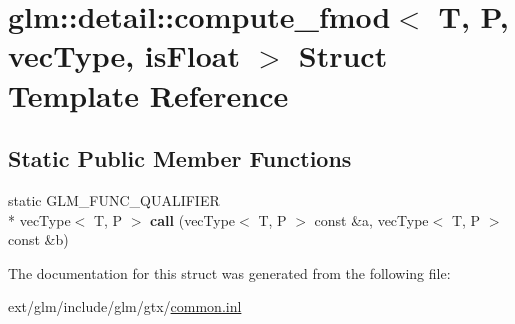 \hypertarget{structglm_1_1detail_1_1compute__fmod}{\section{glm\-:\-:detail\-:\-:compute\-\_\-fmod$<$ T, P, vec\-Type, is\-Float $>$ Struct Template Reference}
\label{structglm_1_1detail_1_1compute__fmod}
}
\subsection*{Static Public Member Functions}
\begin{DoxyCompactItemize}
\item 
\hypertarget{structglm_1_1detail_1_1compute__fmod_add2143b71c7bfb64b030b4eed6ea3ef6}{static G\-L\-M\-\_\-\-F\-U\-N\-C\-\_\-\-Q\-U\-A\-L\-I\-F\-I\-E\-R \\*
vec\-Type$<$ T, P $>$ {\bfseries call} (vec\-Type$<$ T, P $>$ const \&a, vec\-Type$<$ T, P $>$ const \&b)}\label{structglm_1_1detail_1_1compute__fmod_add2143b71c7bfb64b030b4eed6ea3ef6}

\end{DoxyCompactItemize}


The documentation for this struct was generated from the following file\-:\begin{DoxyCompactItemize}
\item 
ext/glm/include/glm/gtx/\hyperlink{common_8inl}{common.\-inl}\end{DoxyCompactItemize}
